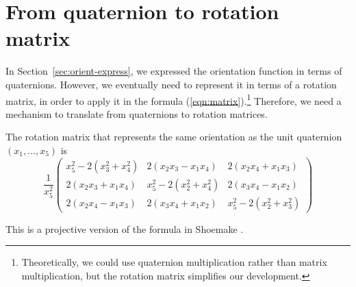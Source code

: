 \section{From quaternion to rotation matrix}
\label{sec:q2rot}

In Section~\ref{sec:orient-express}, we expressed the orientation function in terms
of quaternions.
However, we eventually need to represent it in terms of a rotation matrix,
in order to apply it in the 
formula (\ref{eqn:matrix}).\footnote{Theoretically, we could use
	quaternion multiplication rather than matrix multiplication, but
	the rotation matrix simplifies our development.}
Therefore, we need a mechanism to translate from quaternions to
rotation matrices.

\begin{lemma}
\label{lem:qtorot}
The rotation matrix that represents the same orientation as the 
unit quaternion $(x_1,\ldots,x_5)$ is
\begin{equation}
	\frac{1}{x_5^2}
	\left( \begin{array}{ccc}
	x_5^2 - 2(x_3^2 + x_4^2)& 2(x_2x_3 - x_1x_4)	& 2(x_2x_4 + x_1x_3) \\
	2(x_2x_3 + x_1x_4)	& x_5^2-2(x_2^2 + x_4^2)& 2(x_3x_4 - x_1x_2) \\
	2(x_2x_4 - x_1x_3)	& 2(x_3x_4 + x_1x_2)	& x_5^2-2(x_2^2 + x_3^2)
	\end{array} \right)
\end{equation}
\end{lemma}
\prf
This is a projective version of the formula in Shoemake \cite{shoemake85}.
\QED

